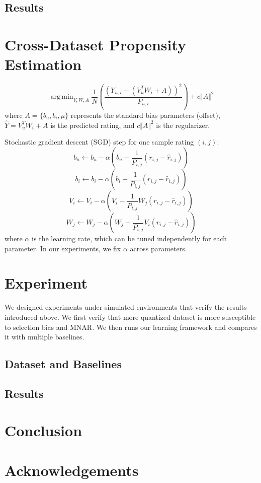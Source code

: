 \documentclass{article}
\DeclareMathOperator*{\argmin}{arg\,min}
\begin{document}
\subsection{Results}

\section{Cross-Dataset Propensity Estimation}

\[ \argmin_{V,W,A} \frac{1}{N}\left(\frac{(Y_{u,i}- (V_u^TW_i + A))^2}{P_{u,i}} \right) + c \Vert A \Vert^2\]
where $A = \{ b_u, b_i, \mu \}$ represents the standard bias parameters (offset), $\hat{Y} = V_u^TW_i + A$ is the predicted rating, and $c \Vert A \Vert^2$ is the regularizer.

Stochastic gradient descent (SGD) step for one sample rating $(i,j)$:
\[ b_u \gets b_u - \alpha(b_u - \frac{1}{P_{i,j}}(r_{i,j} - \hat{r}_{i,j})) \]
\[ b_i \gets b_i - \alpha(b_i - \frac{1}{P_{i,j}}(r_{i,j} - \hat{r}_{i,j})) \]
\[ V_i \gets V_i - \alpha(V_i - \frac{1}{P_{i,j}}W_j(r_{i,j} - \hat{r}_{i,j})) \]
\[ W_j \gets W_j - \alpha(W_j - \frac{1}{P_{i,j}}V_i(r_{i,j} - \hat{r}_{i,j})) \]
where $\alpha$ is the learning rate, which can be tuned independently for each parameter. In our experiments, we fix $\alpha$ across parameters.

\section{Experiment}
We designed experiments under simulated environments that verify the results introduced above. We first verify that more quantized dataset is more susceptible to selection bias and MNAR. We then runs our learning framework and compares it with multiple baselines.

\subsection{Dataset and Baselines}

\subsection{Results}

\section{Conclusion}

\section*{Acknowledgements}
\end{document}
